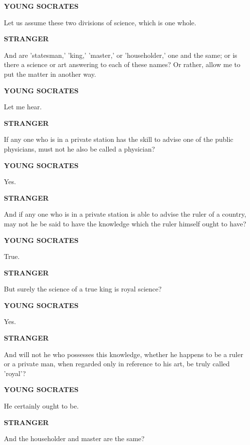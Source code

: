 \documentclass[11pt,letter]{article}
\begin{document}
\par \textbf{YOUNG SOCRATES}
\par   Let us assume these two divisions of science, which is one whole.

\par \textbf{STRANGER}
\par   And are 'statesman,' 'king,' 'master,' or 'householder,' one and the same; or is there a science or art answering to each of these names? Or rather, allow me to put the matter in another way.

\par \textbf{YOUNG SOCRATES}
\par   Let me hear.

\par \textbf{STRANGER}
\par   If any one who is in a private station has the skill to advise one of the public physicians, must not he also be called a physician?

\par \textbf{YOUNG SOCRATES}
\par   Yes.

\par \textbf{STRANGER}
\par   And if any one who is in a private station is able to advise the ruler of a country, may not he be said to have the knowledge which the ruler himself ought to have?

\par \textbf{YOUNG SOCRATES}
\par   True.

\par \textbf{STRANGER}
\par   But surely the science of a true king is royal science?

\par \textbf{YOUNG SOCRATES}
\par   Yes.

\par \textbf{STRANGER}
\par   And will not he who possesses this knowledge, whether he happens to be a ruler or a private man, when regarded only in reference to his art, be truly called 'royal'?

\par \textbf{YOUNG SOCRATES}
\par   He certainly ought to be.

\par \textbf{STRANGER}
\par   And the householder and master are the same?
\end{document}
